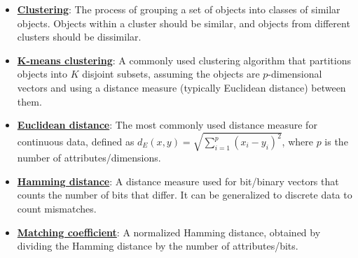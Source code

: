 \documentclass{article}%
\begin{document}
\begin{itemize}[leftmargin=*]
\item \href{https://purdue.brightspace.com/d2l/common/assets/pdfjs-d2l-dist/1.0.14-legacy/web/viewer.html?file=\%2Fcontent\%2Fenforced\%2F1095467-wl.202510.CS.24300.001\%2F12L2-distance-clusters.pdf\%3Fou\%3D1095467\&lang=en-us\&container=d2l-fileviewer-rendered-pdf\&fullscreen=d2l-fileviewer-rendered-pdf-dialog\&height=667#page=4}{\textbf{Clustering}}: The process of grouping a set of objects into classes of similar objects. Objects within a cluster should be similar, and objects from different clusters should be dissimilar.%
\item \href{https://purdue.brightspace.com/d2l/common/assets/pdfjs-d2l-dist/1.0.14-legacy/web/viewer.html?file=\%2Fcontent\%2Fenforced\%2F1095467-wl.202510.CS.24300.001\%2F12L2-distance-clusters.pdf\%3Fou\%3D1095467\&lang=en-us\&container=d2l-fileviewer-rendered-pdf\&fullscreen=d2l-fileviewer-rendered-pdf-dialog\&height=667#page=21}{\textbf{K-means clustering}}: A commonly used clustering algorithm that partitions objects into $K$ disjoint subsets, assuming the objects are $p$-dimensional vectors and using a distance measure (typically Euclidean distance) between them.%
\item \href{https://purdue.brightspace.com/d2l/common/assets/pdfjs-d2l-dist/1.0.14-legacy/web/viewer.html?file=\%2Fcontent\%2Fenforced\%2F1095467-wl.202510.CS.24300.001\%2F12L2-distance-clusters.pdf\%3Fou\%3D1095467\&lang=en-us\&container=d2l-fileviewer-rendered-pdf\&fullscreen=d2l-fileviewer-rendered-pdf-dialog\&height=667#page=17}{\textbf{Euclidean distance}}: The most commonly used distance measure for continuous data, defined as $d_E(x, y) = \sqrt{\sum_{i=1}^p (x_i - y_i)^2}$, where $p$ is the number of attributes/dimensions.%
\item \href{https://purdue.brightspace.com/d2l/common/assets/pdfjs-d2l-dist/1.0.14-legacy/web/viewer.html?file=\%2Fcontent\%2Fenforced\%2F1095467-wl.202510.CS.24300.001\%2F12L2-distance-clusters.pdf\%3Fou\%3D1095467\&lang=en-us\&container=d2l-fileviewer-rendered-pdf\&fullscreen=d2l-fileviewer-rendered-pdf-dialog\&height=667#page=19}{\textbf{Hamming distance}}: A distance measure used for bit/binary vectors that counts the number of bits that differ. It can be generalized to discrete data to count mismatches.%
\item \href{https://purdue.brightspace.com/d2l/common/assets/pdfjs-d2l-dist/1.0.14-legacy/web/viewer.html?file=\%2Fcontent\%2Fenforced\%2F1095467-wl.202510.CS.24300.001\%2F12L2-distance-clusters.pdf\%3Fou\%3D1095467\&lang=en-us\&container=d2l-fileviewer-rendered-pdf\&fullscreen=d2l-fileviewer-rendered-pdf-dialog\&height=667#page=19}{\textbf{Matching coefficient}}: A normalized Hamming distance, obtained by dividing the Hamming distance by the number of attributes/bits.%

\end{itemize}
\end{document}
